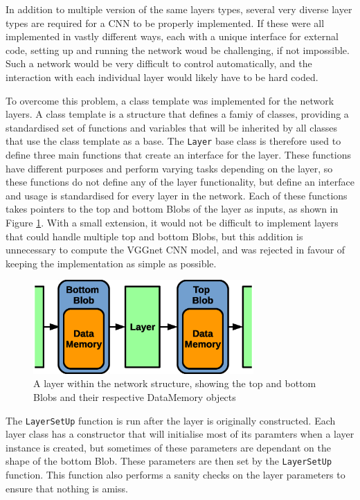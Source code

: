 \documentclass[12pt]{article}
\begin{document}
In addition to multiple version of the same layers types, several very diverse layer types are required for a CNN to be properly implemented. If these were all implemented in vastly different ways, each with a unique interface for external code, setting up and running the network woud be challenging, if not impossible. Such a network would be very difficult to control automatically, and the interaction with each individual layer would likely have to be hard coded. 

To overcome this problem, a class template was implemented for the network layers. A class template is a structure that defines a famiy of classes, providing a standardised set of functions and variables that will be inherited by all classes that use the class template as a base. The \lstinline|Layer| base class is therefore used to define three main functions that create an interface for the layer. These functions have different purposes and perform varying tasks depending on the layer, so these functions do not define any of the layer functionality, but define an interface and usage is standardised for every layer in the network. Each of these functions takes pointers to the top and bottom Blobs of the layer as inputs, as shown in Figure \ref{fig:layer}. With a small extension, it would not be difficult to implement layers that could handle multiple top and bottom Blobs, but this addition is unnecessary to compute the VGGnet CNN model, and was rejected in favour of keeping the implementation as simple as possible.

\begin{figure} [H]
\centering
\includegraphics[width=0.75\textwidth]{figures/layer.eps}
\caption{A layer within the network structure, showing the top and bottom Blobs and their respective DataMemory objects}
\label{fig:layer}
\end{figure}

The \lstinline|LayerSetUp| function is run after the layer is originally constructed. Each layer class has a constructor that will initialise most of its paramters when a layer instance is created, but sometimes of these parameters are dependant on the shape of the bottom Blob. These parameters are then set by the \lstinline|LayerSetUp| function. This function also performs a sanity checks on the layer parameters to ensure that nothing is amiss.
\end{document}
